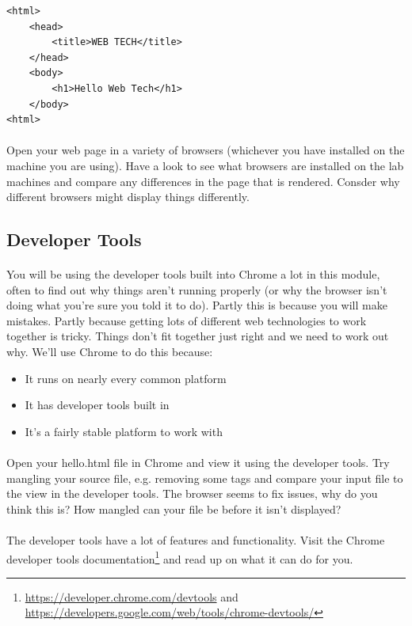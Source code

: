 \documentclass[10pt, a4paper, twosize]{article}
\begin{document}
\begin{lstlisting}
<html>
    <head>
        <title>WEB TECH</title>
    </head>
    <body>
        <h1>Hello Web Tech</h1>
    </body>
<html>
\end{lstlisting}

\paragraph{} Open your web page in a variety of browsers (whichever you have installed on the machine you are using). Have a look to see what browsers are installed on the lab machines and compare any differences in the page that is rendered. Consder why different browsers might display things differently.

\subsection{Developer Tools}
\paragraph{} You will be using the developer tools built into Chrome a lot in this module, often to find out why things aren't running properly (or why the browser isn't doing what you're sure you told it to do). Partly this is because you will make mistakes. Partly because getting lots of different web technologies to work together is tricky. Things don't fit together just right and we need to work out why. We'll use Chrome to do this because:

\begin{itemize}
\item It runs on nearly every common platform
\item It has developer tools built in
\item It's a fairly stable platform to work with
\end{itemize}

\paragraph{} Open your hello.html file in Chrome and view it using the developer tools. Try mangling your source file, e.g. removing some tags and compare your input file to the view in the developer tools. The browser seems to fix issues, why do you think this is? How mangled can your file be before it isn't displayed? 

\paragraph{} The developer tools have a lot of features and functionality. Visit the Chrome developer tools documentation\footnote{\url{https://developer.chrome.com/devtools} and \url{https://developers.google.com/web/tools/chrome-devtools/}} and read up on what it can do for you.
\end{document}
